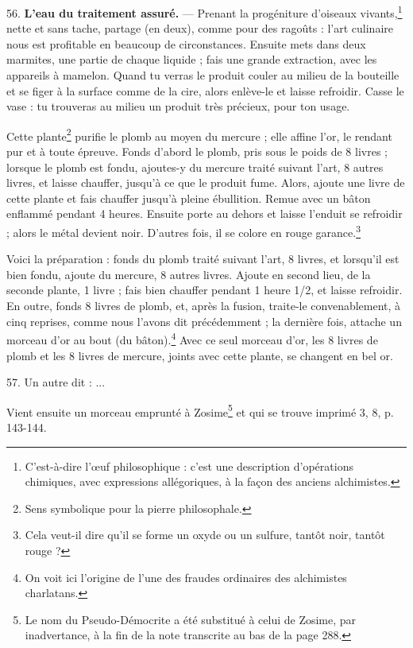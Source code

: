 \documentclass[a4paper, 11pt, oneside, polutonikogreek, french]{article}
\begin{document}
56. \textbf{L'eau du traitement assuré.} --- Prenant la progéniture d'oiseaux vivants,\footnote{C'est-à-dire l'œuf philosophique : c'est une description d'opérations chimiques, avec expressions allégoriques, à la façon des anciens alchimistes.} nette et sans tache, partage (en deux), comme pour des ragoûts : l'art culinaire nous est profitable en beaucoup de circonstances. Ensuite mets dans deux marmites, une partie de chaque liquide ; fais une grande extraction, avec les appareils à mamelon. Quand tu verras le produit couler au milieu de la bouteille et se figer à la surface comme de la cire, alors enlève-le et laisse refroidir. Casse le vase : tu trouveras au milieu un produit très précieux, pour ton usage.

Cette plante\footnote{Sens symbolique pour la pierre philosophale.} purifie le plomb au moyen du mercure ; elle affine l'or, le rendant pur et à toute épreuve. Fonds d'abord le plomb, pris sous le poids de 8 livres ; lorsque le plomb est fondu, ajoutes-y du mercure traité suivant l'art, 8 autres livres, et laisse chauffer, jusqu'à ce que le produit fume. Alors, ajoute une livre de cette plante et fais chauffer jusqu'à pleine ébullition. Remue avec un bâton enflammé pendant 4 heures. Ensuite porte au dehors et laisse l'enduit se refroidir ; alors le métal devient noir. D'autres fois, il se colore en rouge garance.\footnote{Cela veut-il dire qu'il se forme un oxyde ou un sulfure, tantôt noir, tantôt rouge ?}

Voici la préparation : fonds du plomb traité suivant l'art, 8 livres, et lorsqu'il est bien fondu, ajoute du mercure, 8 autres livres. Ajoute en second lieu, de la seconde plante, 1 livre ; fais bien chauffer pendant 1 heure 1/2, et laisse refroidir. En outre, fonds 8 livres de plomb, et, après la fusion, traite-le convenablement, à cinq reprises, comme nous l'avons dit précédemment ; la dernière fois, attache un morceau d'or au bout (du bâton).\footnote{On voit ici l'origine de l'une des fraudes ordinaires des alchimistes charlatans.} Avec ce seul morceau d'or, les 8 livres de plomb et les 8 livres de mercure, joints avec cette plante, se changent en bel or.

57. Un autre dit : ...

Vient ensuite un morceau emprunté à Zosime\footnote{Le nom du Pseudo-Démocrite a été substitué à celui de Zosime, par inadvertance, à la fin de la note transcrite au bas de la page 288.} et qui se trouve imprimé 3, 8, p. 143-144.

\bigskip
\centerline{\EightStarTaper}
\centerline{\EightStarTaper\EightStarTaper}
\bigskip
\end{document}
